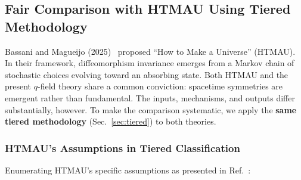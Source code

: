 \documentclass[aps,prd,twocolumn,showpacs,superscriptaddress,preprintnumbers]{revtex4-2}
\begin{document}
\subsection{Fair Comparison with HTMAU Using Tiered Methodology}
\label{sec:htmau_comparison}

Bassani and Magueijo (2025)~\cite{Bassani:2025htma} proposed ``How to Make a Universe'' (HTMAU).
In their framework, diffeomorphism invariance emerges from a Markov chain of stochastic choices evolving toward an absorbing state.
Both HTMAU and the present $q$-field theory share a common conviction: spacetime symmetries are emergent rather than fundamental.
The inputs, mechanisms, and outputs differ substantially, however.
To make the comparison systematic, we apply the \textbf{same tiered methodology} (Sec.~\ref{sec:tiered}) to both theories.

\subsubsection{HTMAU's Assumptions in Tiered Classification}

Enumerating HTMAU's specific assumptions as presented in Ref.~\cite{Bassani:2025htma}:
\end{document}
